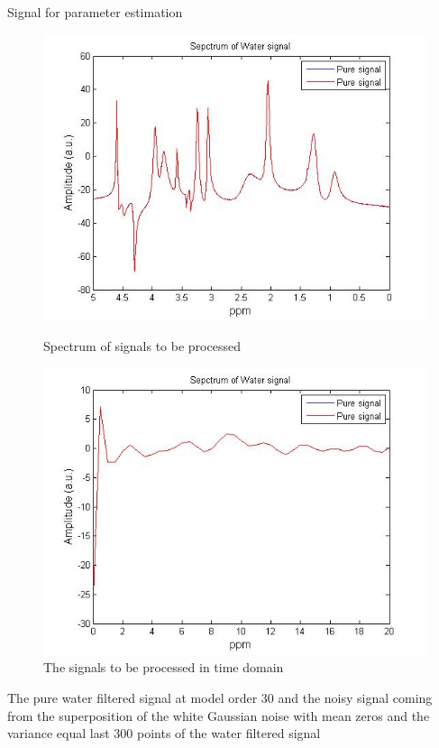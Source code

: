 \documentclass[t,12pt,english
\ifx\beamermode\undefined\else,\beamermode\fi
]{beamer}
\begin{document}
\begin{frame}{Signal for parameter estimation}
    
\begin{figure}[!htbp]
%
\centering
\includegraphics[width=1\textwidth]{35.jpg}
\caption{\tiny Spectrum of signals to be processed}
\endminipage\hfill
{}%
\centering
\includegraphics[width=1\textwidth]{36.jpg}
\caption{\tiny The signals to be processed in time domain}
\endminipage\hfill
\centering
\end{figure}

\tiny{The pure water filtered signal at model order 30 and the noisy signal coming from the superposition of the white Gaussian noise with mean zeros and the variance equal last 300 points of the water filtered signal}  

\end{frame}
\end{document}
